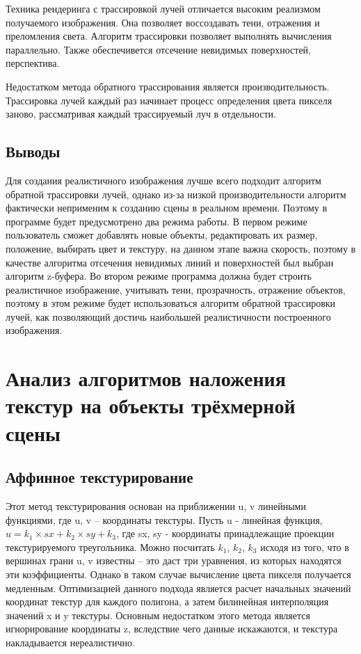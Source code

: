 \documentclass[12pt,a4paper,oneside]{report}
\begin{document}
 	 Техника рендеринга с трассировкой лучей отличается высоким реализмом получаемого изображения\cite{four}. Она позволяет воссоздавать тени, отражения и преломления света. Алгоритм трассировки позволяет выполнять вычисления параллельно. Также обеспечивется отсечение невидимых поверхностей, перспектива.
 	
 	 Недостатком метода обратного трассирования является производительность. Трассировка лучей каждый раз начинает процесс определения цвета пикселя заново, рассматривая каждый трассируемый луч в отдельности.
 	
 	\subsection {Выводы}
 	 \quad Для создания реалистичного изображения лучше всего подходит алгоритм обратной трассировки лучей, однако из-за низкой производительности алгоритм фактически неприменим к созданию сцены в реальном времени. Поэтому в программе будет предусмотрено два режима работы. В первом режиме пользователь сможет добавлять новые объекты, редактировать их размер, положение, выбирать цвет и текстуру, на данном этапе важна скорость, поэтому в качестве алгоритма отсечения невидимых линий и поверхностей был выбран алгоритм z-буфера. Во втором режиме программа должна будет строить реалистичное изображение, учитывать тени, прозрачность, отражение объектов, поэтому в этом режиме будет использоваться алгоритм обратной трассировки лучей, как позволяющий достичь наибольшей реалистичности построенного изображения.
 	
 	\section {Анализ алгоритмов наложения текстур на объекты трёхмерной сцены}
 	\subsection{Аффинное текстурирование}
 	 \quad Этот метод текстурирования основан на приближении u, v линейными функциями, где u, v – координаты текстуры. Пусть u - линейная функция, $u = k_1 \times sx + k_2 \times sy + k_3$, где sx, sy - координаты принадлежащие проекции текстурируемого треугольника. Можно посчитать $k_1$, $k_2$, $k_3$ исходя из того, что в вершинах грани u, v известны -- это даст три уравнения, из которых находятся эти коэффициенты. Однако в таком случае вычисление цвета пикселя получается медленным. Оптимизацией данного подхода является расчет начальных значений координат текстур для каждого полигона, а затем билинейная интерполяция значений x и y текстуры. Основным недостатком этого метода является игнорирование координаты z, вследствие чего данные искажаются, и текстура накладывается нереалистично.
 	
\end{document}
